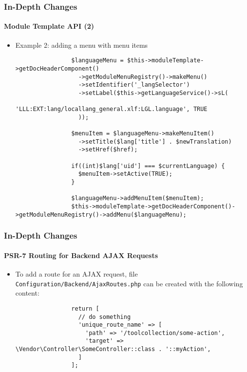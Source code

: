 \begin{frame}[fragile]
	\frametitle{In-Depth Changes}
	\framesubtitle{Module Template API (2)}

	\lstset{basicstyle=\tiny\ttfamily}

	\begin{itemize}
		\item Example 2: adding a menu with menu items

			\begin{lstlisting}
				$languageMenu = $this->moduleTemplate->getDocHeaderComponent()
				  ->getModuleMenuRegistry()->makeMenu()
				  ->setIdentifier('_langSelector')
				  ->setLabel($this->getLanguageService()->sL(
				    'LLL:EXT:lang/locallang_general.xlf:LGL.language', TRUE
				  ));

				$menuItem = $languageMenu->makeMenuItem()
				  ->setTitle($lang['title'] . $newTranslation)
				  ->setHref($href);

				if((int)$lang['uid'] === $currentLanguage) {
				  $menuItem->setActive(TRUE);
				}

				$languageMenu->addMenuItem($menuItem);
				$this->moduleTemplate->getDocHeaderComponent()->getModuleMenuRegistry()->addMenu($languageMenu);
			\end{lstlisting}
	\end{itemize}

\end{frame}



\begin{frame}[fragile]
	\frametitle{In-Depth Changes}
	\framesubtitle{PSR-7 Routing for Backend AJAX Requests}

	\lstset{basicstyle=\tiny\ttfamily}

	\begin{itemize}

		\item To add a route for an AJAX request, file
			\texttt{Configuration/Backend/AjaxRoutes.php}\newline
			can be created with the following content:

			\begin{lstlisting}
				return [
				  // do something
				  'unique_route_name' => [
				    'path' => '/toolcollection/some-action',
				    'target' => \Vendor\Controller\SomeController::class . '::myAction',
				  ]
				];
			\end{lstlisting}

	\end{itemize}

\end{frame}

